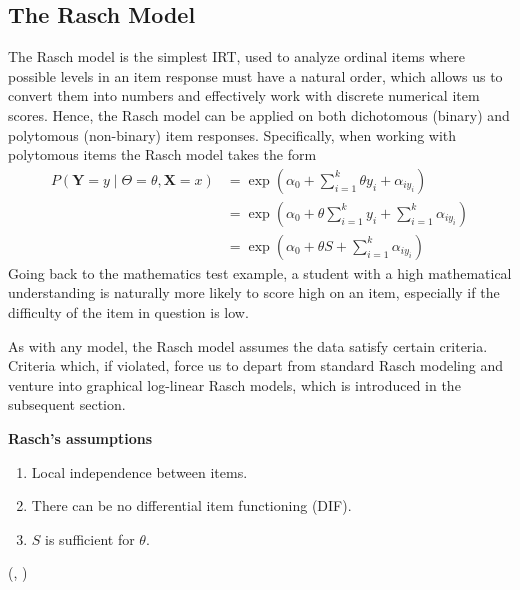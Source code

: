 \documentclass[a4project,12pt]{article}
\theoremstyle{examplestyle}
\theoremstyle{defstyle}
\theoremstyle{thmstyle}
\begin{document}
\subsection{The Rasch Model}

The Rasch model is the simplest IRT, used to analyze ordinal items where possible levels in an item response must have a natural order, which allows us to convert them into numbers and effectively work with discrete numerical item scores. Hence, the Rasch model can be applied on both dichotomous (binary) and polytomous (non-binary) item responses. Specifically, when working with polytomous items the Rasch model takes the form
\begin{align}
    P(\mathbf{Y}=y\mid \Theta = \theta, \mathbf{X}=x) &= \exp\left(\alpha_0+\sum_{i=1}^k\theta y_i+\alpha_{iy_i}\right) 
    \\ &= \exp\left(\alpha_0+\theta\sum_{i=1}^k y_i+\sum_{i=1}^k\alpha_{iy_i}\right) \\ &= \exp\left(\alpha_0+\theta S+\sum_{i=1}^k\alpha_{iy_i}\right) \label{eq:sufficient}
\end{align}
Going back to the mathematics test example, a student with a high mathematical understanding is naturally more likely to score high on an item, especially if the difficulty of the item in question is low. 

As with any model, the Rasch model assumes the data satisfy certain criteria. Criteria which, if violated, force us to depart from standard Rasch modeling and venture into graphical log-linear Rasch models, which is introduced in the subsequent section.
\begin{mybox2} 
\textbf{Rasch's assumptions}
\begin{enumerate}
    \item Local independence between items.
    \item There can be no differential item functioning (DIF).
    \item $S$ is sufficient for $\theta$.
\end{enumerate}
\end{mybox2}
(\cite{rasch-1960}, \cite{fischer-molenaar-1995})


\end{document}
